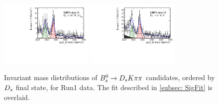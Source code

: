 \begin{figure}[h]
\includegraphics[height=!,width=0.4\textwidth]{figs/MassFit/signal_y12_KKpi_NR.pdf}
\includegraphics[height=!,width=0.4\textwidth]{figs/MassFit/signal_y12_pipipi.pdf}
\caption{Invariant mass distributions of ${{B}^0_{s}}\rightarrow{\ensuremath{{D}_{s}}}{\ensuremath{K}}{\ensuremath{\pi}}{\ensuremath{\pi}}$ candidates, ordered by ${{D}_{s}}$ final state, for Run1 data.
The fit described in \ref{subsec: SigFit} is overlaid.}
\label{fig:massfits_signal_Run1}
\end{figure}

\clearpage

